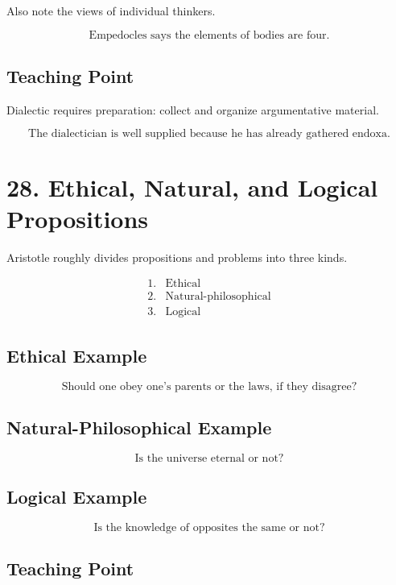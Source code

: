 \documentclass[12pt]{article}
\begin{document}
Also note the views of individual thinkers.

\[
\text{Empedocles says the elements of bodies are four.}
\]

\subsection*{Teaching Point}

Dialectic requires preparation: collect and organize argumentative material.

\[
\boxed{
\text{The dialectician is well supplied because he has already gathered endoxa.}
}
\]

\section*{28. Ethical, Natural, and Logical Propositions}

Aristotle roughly divides propositions and problems into three kinds.

\[
\begin{array}{ll}
1. & \text{Ethical} \\
2. & \text{Natural-philosophical} \\
3. & \text{Logical}
\end{array}
\]

\subsection*{Ethical Example}

\[
\text{Should one obey one's parents or the laws, if they disagree?}
\]

\subsection*{Natural-Philosophical Example}

\[
\text{Is the universe eternal or not?}
\]

\subsection*{Logical Example}

\[
\text{Is the knowledge of opposites the same or not?}
\]

\subsection*{Teaching Point}
\end{document}
